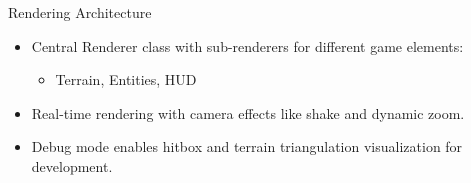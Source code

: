 \begin{frame}{Rendering Architecture}
    \begin{itemize}
        \item Central Renderer class with sub-renderers for different game elements:
        \begin{itemize}
            \item Terrain, Entities, HUD
        \end{itemize}
        \item Real-time rendering with camera effects like shake and dynamic zoom.
        \item Debug mode enables hitbox and terrain triangulation visualization for development.
    \end{itemize}
\end{frame}